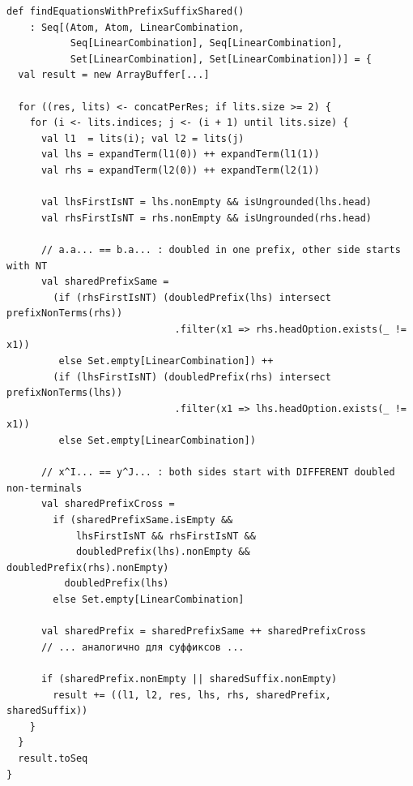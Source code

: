 \documentclass[14pt, russian]{scrartcl}
\begin{document}
\newpage
\begin{listing}[H]
\caption{Метод \texttt{findEquationsWithPrefixSuffixShared}}
\label{lst:find}
\begin{verbatim}
def findEquationsWithPrefixSuffixShared()
    : Seq[(Atom, Atom, LinearCombination,
           Seq[LinearCombination], Seq[LinearCombination],
           Set[LinearCombination], Set[LinearCombination])] = {
  val result = new ArrayBuffer[...]

  for ((res, lits) <- concatPerRes; if lits.size >= 2) {
    for (i <- lits.indices; j <- (i + 1) until lits.size) {
      val l1  = lits(i); val l2 = lits(j)
      val lhs = expandTerm(l1(0)) ++ expandTerm(l1(1))
      val rhs = expandTerm(l2(0)) ++ expandTerm(l2(1))

      val lhsFirstIsNT = lhs.nonEmpty && isUngrounded(lhs.head)
      val rhsFirstIsNT = rhs.nonEmpty && isUngrounded(rhs.head)

      // a.a... == b.a... : doubled in one prefix, other side starts with NT
      val sharedPrefixSame =
        (if (rhsFirstIsNT) (doubledPrefix(lhs) intersect prefixNonTerms(rhs))
                             .filter(x1 => rhs.headOption.exists(_ != x1))
         else Set.empty[LinearCombination]) ++
        (if (lhsFirstIsNT) (doubledPrefix(rhs) intersect prefixNonTerms(lhs))
                             .filter(x1 => lhs.headOption.exists(_ != x1))
         else Set.empty[LinearCombination])

      // x^I... == y^J... : both sides start with DIFFERENT doubled non-terminals
      val sharedPrefixCross =
        if (sharedPrefixSame.isEmpty &&
            lhsFirstIsNT && rhsFirstIsNT &&
            doubledPrefix(lhs).nonEmpty && doubledPrefix(rhs).nonEmpty)
          doubledPrefix(lhs)
        else Set.empty[LinearCombination]

      val sharedPrefix = sharedPrefixSame ++ sharedPrefixCross
      // ... аналогично для суффиксов ...

      if (sharedPrefix.nonEmpty || sharedSuffix.nonEmpty)
        result += ((l1, l2, res, lhs, rhs, sharedPrefix, sharedSuffix))
    }
  }
  result.toSeq
}
\end{verbatim}
\end{listing}
\end{document}

